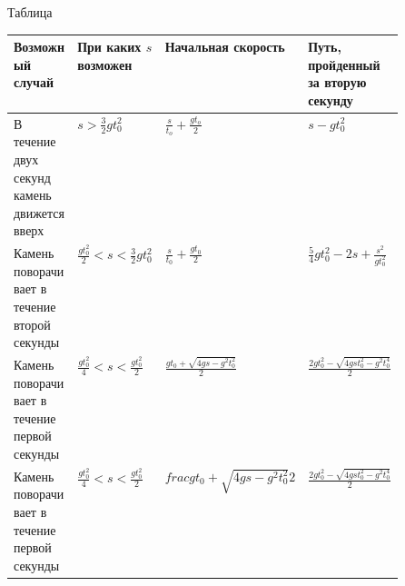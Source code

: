 \documentclass[8pt, letterpaper]{article}
\begin{document}
\flushright
Таблица
\begin{tabular}{ |p{0.3\linewidth}| l | l | p{0.2\linewidth} | }

\hline

Возможный случай & При каких $s$ возможен & Начальная скорость & Путь, пройденный за вторую секунду \\ \hline

В течение двух секунд камень движется вверх & $s>\frac{3}{2}gt_{0}^2$ & $\frac{s}{t_{o}}+\frac{gt_{o}}{2}$ & $s-gt_{0}^2$ \\ \hline
Камень поворачивает в течение второй секунды & $\frac{gt_{0}^2}{2}<s<\frac{3}{2}gt_{0}^2$ & $\frac{s}{t_{0}}+\frac{gt_{0}}{2}$ & $\frac{5}{4}gt_{0}^2-2s+\frac{s^2}{gt_{0}^2}$ \\ \hline
Камень поворачивает в течение первой секунды & $\frac{gt_{0}^2}{4} < s < \frac{gt_{0}^2}{2}$ & $\frac{gt_{0}+\sqrt{4gs-g^2t_{0}^2}}{2}$ & $\frac{2gt_{0}^2-\sqrt{4gst_{0}^2-g^2t_{0}^4}}{2}$ \\ \hline
Камень поворачивает в течение первой секунды & $\frac{gt_{0}^2}{4}<s<\frac{gt_{0}^2}{2}$ & $frac{gt_{0}+\sqrt{4gs-g^2t_{0}^2}}{2}$ & $\frac{2gt_{0}^2-\sqrt{4gst_{0}^2-g^2t_{0}^4}}{2}$\\
\hline
\end{tabular}
\end{document}
